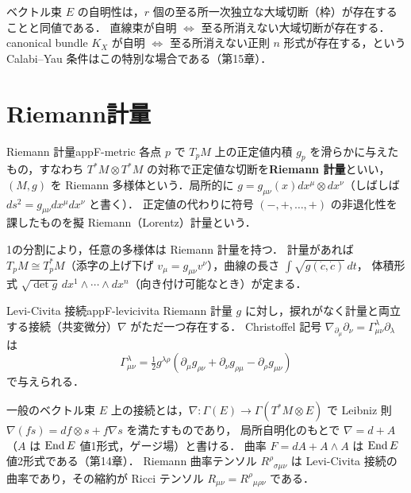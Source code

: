 \begin{note}
ベクトル束 $E$ の自明性は，$r$ 個の至る所一次独立な大域切断（枠）が存在することと同値である．
直線束が自明 $\iff$ 至る所消えない大域切断が存在する．
canonical bundle $K_X$ が自明 $\iff$ 至る所消えない正則 $n$ 形式が存在する，という Calabi--Yau 条件はこの特別な場合である（第15章）．
\end{note}

\section{Riemann計量}

\begin{mydef}{Riemann 計量}{appF-metric}
各点 $p$ で $T_pM$ 上の正定値内積 $g_p$ を滑らかに与えたもの，すなわち $T^*M\otimes T^*M$ の対称で正定値な切断を\textbf{Riemann 計量}といい，
$(M,g)$ を Riemann 多様体という．局所的に $g=g_{\mu\nu}(x)dx^\mu\otimes dx^\nu$（しばしば $ds^2=g_{\mu\nu}dx^\mu dx^\nu$ と書く）．
正定値の代わりに符号 $(-,+,\dots,+)$ の非退化性を課したものを擬 Riemann（Lorentz）計量という．
\end{mydef}

1の分割により，任意の多様体は Riemann 計量を持つ．
計量があれば $T_pM\cong T_p^*M$（添字の上げ下げ $v_\mu=g_{\mu\nu}v^\nu$），曲線の長さ $\int\sqrt{g(\dot c,\dot c)}\,dt$，
体積形式 $\sqrt{\det g}\,dx^1\wedge\cdots\wedge dx^n$（向き付け可能なとき）が定まる．

\begin{mydef}{Levi-Civita 接続}{appF-levicivita}
Riemann 計量 $g$ に対し，捩れがなく計量と両立する接続（共変微分）$\nabla$ がただ一つ存在する．
Christoffel 記号 $\nabla_{\partial_\mu}\partial_\nu=\Gamma^\lambda_{\mu\nu}\partial_\lambda$ は
\[
\Gamma^\lambda_{\mu\nu}=\tfrac12g^{\lambda\rho}(\partial_\mu g_{\rho\nu}+\partial_\nu g_{\rho\mu}-\partial_\rho g_{\mu\nu})
\]
で与えられる．
\end{mydef}

一般のベクトル束 $E$ 上の接続とは，$\nabla\colon\Gamma(E)\to\Gamma(T^*M\otimes E)$ で Leibniz 則 $\nabla(fs)=df\otimes s+f\nabla s$ を満たすものであり，
局所自明化のもとで $\nabla=d+A$（$A$ は $\operatorname{End} E$ 値1形式，ゲージ場）と書ける．
曲率 $F=dA+A\wedge A$ は $\operatorname{End} E$ 値2形式である（第14章）．
Riemann 曲率テンソル $R^\rho{}_{\sigma\mu\nu}$ は Levi-Civita 接続の曲率であり，その縮約が Ricci テンソル $R_{\mu\nu}=R^\rho{}_{\mu\rho\nu}$ である．

